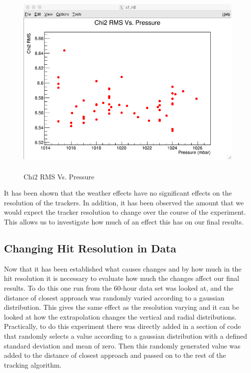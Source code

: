 \documentclass[./Thesis]{subfiles}
\begin{document}
\begin{figure}
	\centerline{\includegraphics[height=95mm]{Chi2RMSVsPressure.png}}
	\caption[Chi2 RMS Vs. Pressure]{Chi2 RMS Vs. Pressure}
	\label{fig:chiRMSPres}
\end{figure}
	

	 
	 It has been shown that the weather effects have no significant effects on the resolution of the trackers.  In addition, it has been observed the amount that we would expect the tracker resolution to change over the course of the experiment. This allows us to investigate how much of an effect this has on our final results.
	
\subsection{Changing Hit Resolution in Data}

		Now that it has been established what causes changes and by how much in the hit resolution it is necessary to evaluate how much the changes affect our final results. To do this one run from the 60-hour data set was looked at, and the distance of closest approach was randomly varied according to a gaussian distribution.  This gives the same effect as the resolution varying and it can be looked at how the extrapolation changes the vertical and radial distributions.  Practically, to do this experiment there was directly added in a section of code that randomly selects a value according to a gaussian distribution with a defined standard deviation and mean of zero.  Then this randomly generated value was added to the distance of closest approach and passed on to the rest of the tracking algorithm. 
		
\end{document}
